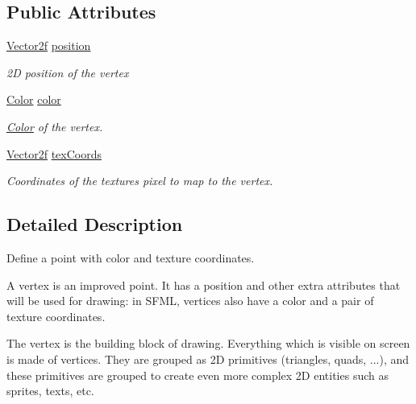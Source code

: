 \subsection*{Public Attributes}
\begin{DoxyCompactItemize}
\item 
\mbox{\label{classsf_1_1_vertex_a8a4e0f4dfa7f1eb215c92e93d04f0ac0}} 
\hyperlink{classsf_1_1_vector2}{Vector2f} \hyperlink{classsf_1_1_vertex_a8a4e0f4dfa7f1eb215c92e93d04f0ac0}{position}
\begin{DoxyCompactList}\small\item\em 2D position of the vertex \end{DoxyCompactList}\item 
\mbox{\label{classsf_1_1_vertex_a799faa0629442e90f07cd2edb568ff80}} 
\hyperlink{classsf_1_1_color}{Color} \hyperlink{classsf_1_1_vertex_a799faa0629442e90f07cd2edb568ff80}{color}
\begin{DoxyCompactList}\small\item\em \hyperlink{classsf_1_1_color}{Color} of the vertex. \end{DoxyCompactList}\item 
\mbox{\label{classsf_1_1_vertex_a9e79bd05818d36c4789751908037097c}} 
\hyperlink{classsf_1_1_vector2}{Vector2f} \hyperlink{classsf_1_1_vertex_a9e79bd05818d36c4789751908037097c}{tex\+Coords}
\begin{DoxyCompactList}\small\item\em Coordinates of the texture\textquotesingle{}s pixel to map to the vertex. \end{DoxyCompactList}\end{DoxyCompactItemize}


\subsection{Detailed Description}
Define a point with color and texture coordinates. 

A vertex is an improved point. It has a position and other extra attributes that will be used for drawing\+: in S\+F\+ML, vertices also have a color and a pair of texture coordinates.

The vertex is the building block of drawing. Everything which is visible on screen is made of vertices. They are grouped as 2D primitives (triangles, quads, ...), and these primitives are grouped to create even more complex 2D entities such as sprites, texts, etc.

